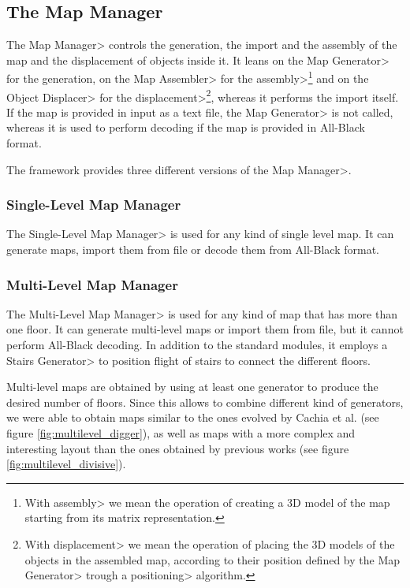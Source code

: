 
\subsection{The Map Manager}

The \<Map Manager> controls the generation, the import and the assembly of the map and the displacement of objects inside it. It leans on the \<Map Generator> for the generation, on the \<Map Assembler> for the \<assembly>\footnote{With \<assembly> we mean the operation of creating a 3D model of the map starting from its matrix representation.} and on the \<Object Displacer> for the \<displacement>\footnote{With \<displacement> we mean the operation of placing the 3D models of the objects in the assembled map, according to their position defined by the \<Map Generator> trough a \<positioning> algorithm.}, whereas it performs the import itself. If the map is provided in input as a text file, the \<Map Generator> is not called, whereas it is used to perform decoding if the map is provided in All-Black format.

\par

The framework provides three different versions of the \<Map Manager>.

\subsubsection{Single-Level Map Manager}

The \<Single-Level Map Manager> is used for any kind of single level map. It can generate maps, import them from file or decode them from All-Black format.

\subsubsection{Multi-Level Map Manager}

The \<Multi-Level Map Manager> is used for any kind of map that has more than one floor. It can generate multi-level maps or import them from file, but it cannot perform All-Black decoding. In addition to the standard modules, it employs a \<Stairs Generator> to position flight of stairs to connect the different floors. 

\par

Multi-level maps are obtained by using at least one generator to produce the desired number of floors. Since this allows to combine different kind of generators, we were able to obtain maps similar to the ones evolved by Cachia et al.\cite{MultiLevelEvolution} (see figure \ref{fig:multilevel_digger}), as well as maps with a more complex and interesting layout than the ones obtained by previous works (see figure \ref{fig:multilevel_divisive}).

